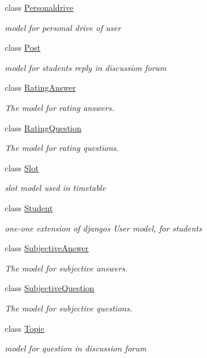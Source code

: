 \begin{DoxyCompactItemize}
class \hyperlink{classmodels_1_1_personaldrive}{Personaldrive}
\begin{DoxyCompactList}\small\item\em model for personal drive of user \end{DoxyCompactList}\item 
class \hyperlink{classmodels_1_1_post}{Post}
\begin{DoxyCompactList}\small\item\em model for student\textquotesingle{}s reply in discussion forum \end{DoxyCompactList}\item 
class \hyperlink{classmodels_1_1_rating_answer}{Rating\+Answer}
\begin{DoxyCompactList}\small\item\em The model for rating answers. \end{DoxyCompactList}\item 
class \hyperlink{classmodels_1_1_rating_question}{Rating\+Question}
\begin{DoxyCompactList}\small\item\em The model for rating questions. \end{DoxyCompactList}\item 
class \hyperlink{classmodels_1_1_slot}{Slot}
\begin{DoxyCompactList}\small\item\em slot model used in timetable \end{DoxyCompactList}\item 
class \hyperlink{classmodels_1_1_student}{Student}
\begin{DoxyCompactList}\small\item\em one-\/one extension of django\textquotesingle{}s User model, for students \end{DoxyCompactList}\item 
class \hyperlink{classmodels_1_1_subjective_answer}{Subjective\+Answer}
\begin{DoxyCompactList}\small\item\em The model for subjective answers. \end{DoxyCompactList}\item 
class \hyperlink{classmodels_1_1_subjective_question}{Subjective\+Question}
\begin{DoxyCompactList}\small\item\em The model for subjective questions. \end{DoxyCompactList}\item 
class \hyperlink{classmodels_1_1_topic}{Topic}
\begin{DoxyCompactList}\small\item\em model for question in discussion forum \end{DoxyCompactList}\end{DoxyCompactItemize}
